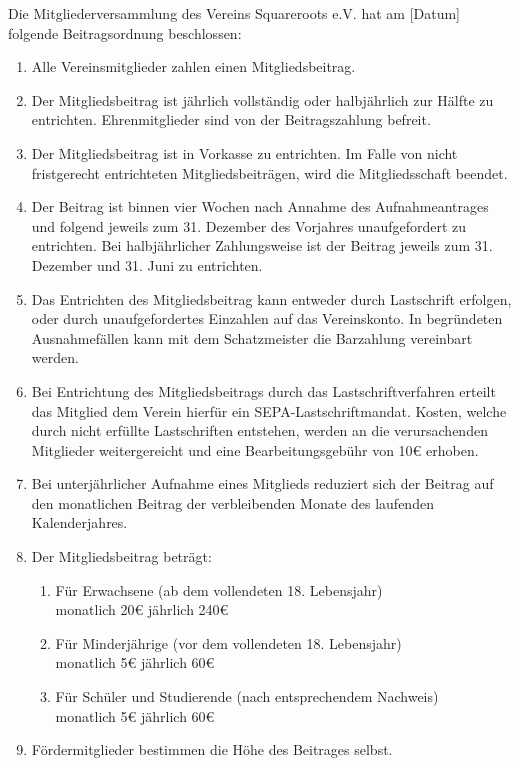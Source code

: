 \documentclass[a4paper,ngerman]{scrartcl}
\begin{document}
Die Mitgliederversammlung des Vereins Squareroots e.V. hat am [Datum] folgende Beitragsordnung beschlossen:

\begin{enumerate}
\item Alle Vereinsmitglieder zahlen einen Mitgliedsbeitrag.
\item Der Mitgliedsbeitrag ist jährlich vollständig oder halbjährlich zur Hälfte zu entrichten. Ehrenmitglieder sind von der Beitragszahlung befreit.
\item Der Mitgliedsbeitrag ist in Vorkasse zu entrichten. Im Falle von nicht fristgerecht entrichteten Mitgliedsbeiträgen, wird die Mitgliedsschaft beendet.
\item Der Beitrag ist binnen vier Wochen nach Annahme des Aufnahmeantrages und folgend jeweils zum 31. Dezember des Vorjahres unaufgefordert zu entrichten. Bei halbjährlicher Zahlungsweise ist der Beitrag jeweils zum 31. Dezember und 31. Juni zu entrichten.
\item Das Entrichten des Mitgliedsbeitrag kann entweder durch Lastschrift erfolgen, oder durch unaufgefordertes Einzahlen auf das Vereinskonto. In begründeten Ausnahmefällen kann mit dem Schatzmeister die Barzahlung vereinbart werden.
\item Bei Entrichtung des Mitgliedsbeitrags durch das Lastschriftverfahren erteilt das Mitglied dem Verein hierfür ein SEPA-Lastschriftmandat. Kosten, welche durch nicht erfüllte Lastschriften entstehen, werden an die verursachenden Mitglieder weitergereicht und eine Bearbeitungsgebühr von 10€ erhoben.
\item Bei unterjährlicher Aufnahme eines Mitglieds reduziert sich der Beitrag auf den monatlichen Beitrag der verbleibenden Monate des laufenden Kalenderjahres.
\item Der Mitgliedsbeitrag beträgt:
\begin{enumerate}
\item Für Erwachsene (ab dem vollendeten 18. Lebensjahr)\\
monatlich 20€          jährlich 240€
\item Für Minderjährige (vor dem vollendeten 18. Lebensjahr)\\
monatlich 5€            jährlich 60€
\item Für Schüler und Studierende (nach entsprechendem Nachweis)\\
monatlich 5€            jährlich 60€
\end{enumerate}
\item Fördermitglieder bestimmen die Höhe des Beitrages selbst.

\end{enumerate}
\end{document}
